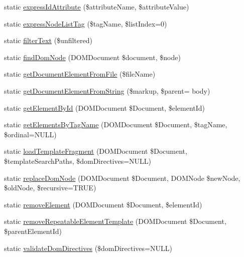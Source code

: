 \begin{DoxyCompactItemize}
\item 
static \hyperlink{class_able_polecat___dom_a138060e6381f32e5185e73b24b92ee16}{express\+Id\+Attribute} (\$attribute\+Name, \$attribute\+Value)
\item 
static \hyperlink{class_able_polecat___dom_aff5eb125ca5654a7f6a500d2e3ec31c2}{express\+Node\+List\+Tag} (\$tag\+Name, \$list\+Index=0)
\item 
static \hyperlink{class_able_polecat___dom_a1306dced67912a44323e487f9b402988}{filter\+Text} (\$unfiltered)
\item 
static \hyperlink{class_able_polecat___dom_ab1a5042bb85221c106a5a07af4d723ec}{find\+Dom\+Node} (D\+O\+M\+Document \$document, \$node)
\item 
static \hyperlink{class_able_polecat___dom_aa7221e9cda6c7e7c9553a426dea7d158}{get\+Document\+Element\+From\+File} (\$file\+Name)
\item 
static \hyperlink{class_able_polecat___dom_a2bc21e5cebf1e1fc6c22f9012334034e}{get\+Document\+Element\+From\+String} (\$markup, \$parent= \textquotesingle{}body\textquotesingle{})
\item 
static \hyperlink{class_able_polecat___dom_a79182dba0e9930ee3ef3ac839d978b99}{get\+Element\+By\+Id} (D\+O\+M\+Document \$Document, \$element\+Id)
\item 
static \hyperlink{class_able_polecat___dom_a5ae1b6fff02a62f11bb63ba40b18ae61}{get\+Elements\+By\+Tag\+Name} (D\+O\+M\+Document \$Document, \$tag\+Name, \$ordinal=N\+U\+L\+L)
\item 
static \hyperlink{class_able_polecat___dom_af8f857ffafb0c1e59d752b7b430a95a0}{load\+Template\+Fragment} (D\+O\+M\+Document \$Document, \$template\+Search\+Paths, \$dom\+Directives=N\+U\+L\+L)
\item 
static \hyperlink{class_able_polecat___dom_a69921449b11dd8722594d30bada6e01c}{replace\+Dom\+Node} (D\+O\+M\+Document \$Document, D\+O\+M\+Node \$new\+Node, \$old\+Node, \$recursive=T\+R\+U\+E)
\item 
static \hyperlink{class_able_polecat___dom_aef162dea2082bb576ed941f9d00b8b4b}{remove\+Element} (D\+O\+M\+Document \$Document, \$element\+Id)
\item 
static \hyperlink{class_able_polecat___dom_af83876af9217e0800695045b852f768c}{remove\+Repeatable\+Element\+Template} (D\+O\+M\+Document \$Document, \$parent\+Element\+Id)
\item 
static \hyperlink{class_able_polecat___dom_a1559ea405748c817f597fa8b03981613}{validate\+Dom\+Directives} (\$dom\+Directives=N\+U\+L\+L)
\end{DoxyCompactItemize}
